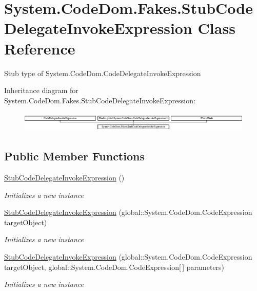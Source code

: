 \hypertarget{class_system_1_1_code_dom_1_1_fakes_1_1_stub_code_delegate_invoke_expression}{\section{System.\-Code\-Dom.\-Fakes.\-Stub\-Code\-Delegate\-Invoke\-Expression Class Reference}
\label{class_system_1_1_code_dom_1_1_fakes_1_1_stub_code_delegate_invoke_expression}
}


Stub type of System.\-Code\-Dom.\-Code\-Delegate\-Invoke\-Expression 


Inheritance diagram for System.\-Code\-Dom.\-Fakes.\-Stub\-Code\-Delegate\-Invoke\-Expression\-:\begin{figure}[H]
\begin{center}
\leavevmode
\includegraphics[height=0.952381cm]{class_system_1_1_code_dom_1_1_fakes_1_1_stub_code_delegate_invoke_expression}
\end{center}
\end{figure}
\subsection*{Public Member Functions}
\begin{DoxyCompactItemize}
\item 
\hyperlink{class_system_1_1_code_dom_1_1_fakes_1_1_stub_code_delegate_invoke_expression_ad0e4dd3e0df122cefcefdcbf582d8dec}{Stub\-Code\-Delegate\-Invoke\-Expression} ()
\begin{DoxyCompactList}\small\item\em Initializes a new instance\end{DoxyCompactList}\item 
\hyperlink{class_system_1_1_code_dom_1_1_fakes_1_1_stub_code_delegate_invoke_expression_aa0b47ae80dff1742f0cc1ed66078ddff}{Stub\-Code\-Delegate\-Invoke\-Expression} (global\-::\-System.\-Code\-Dom.\-Code\-Expression target\-Object)
\begin{DoxyCompactList}\small\item\em Initializes a new instance\end{DoxyCompactList}\item 
\hyperlink{class_system_1_1_code_dom_1_1_fakes_1_1_stub_code_delegate_invoke_expression_ac722606554fda9d48526eb82f6f8bc9a}{Stub\-Code\-Delegate\-Invoke\-Expression} (global\-::\-System.\-Code\-Dom.\-Code\-Expression target\-Object, global\-::\-System.\-Code\-Dom.\-Code\-Expression\mbox{[}$\,$\mbox{]} parameters)
\begin{DoxyCompactList}\small\item\em Initializes a new instance\end{DoxyCompactList}\end{DoxyCompactItemize}
